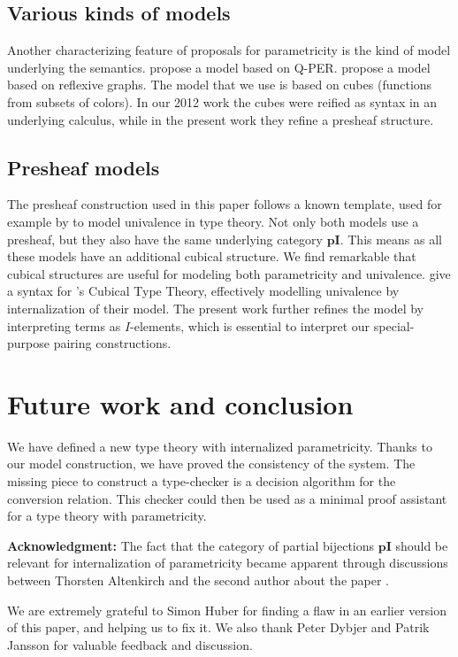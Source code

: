 \documentclass[english]{PaperTools/latex/lipics}
\def\pI{\ensuremath{\mathbf{pI}}}
\begin{document}
\subsection{Various kinds of models}
Another characterizing feature of proposals for parametricity is the
kind of model underlying the
semantics.  propose a model
based on Q-PER.  propose a model based
on reflexive graphs. The model that we use is based on cubes
(functions from subsets of colors). In
our 2012 work the cubes were reified as syntax in
an underlying calculus, while in the present work they refine a presheaf structure.

\subsection{Presheaf models}

The presheaf construction used in this paper follows a known template,
used for example by \citet{bezem2014model,DBLP:journals/corr/Pitts14}
to model univalence in type theory. Not only both models use a
presheaf, but they also have the same underlying category $\pI$.
This means as all these models have an additional cubical structure.
We find remarkable that cubical structures are useful for modeling both
parametricity and univalence.
\cite{altenkirch2014syntax} give a syntax for
\citeauthor{bezem2014model}'s Cubical Type Theory, effectively modelling
univalence by internalization of their model.
The present work further refines the model by interpreting terms as
$I$-elements, which is essential to interpret our special-purpose
pairing constructions.

\section{Future work and conclusion}
We have defined a new type theory with internalized parametricity.
Thanks to our model construction, we have proved the consistency of
the system. The missing piece to construct a type-checker is a
decision algorithm for the conversion relation.  This checker could
then be used as a minimal proof assistant for a type theory with
parametricity.

\bigskip
\noindent
\textbf{Acknowledgment:}
The fact that the category of partial bijections \pI{} should be
relevant for internalization of parametricity became apparent through
discussions between Thorsten Altenkirch and the second  author about
the paper \citep{bernardy_computational_2012}.

We are extremely grateful to Simon Huber for finding a flaw in an
earlier version of this paper, and helping us to fix it.
We also thank Peter Dybjer and Patrik Jansson for valuable feedback and
discussion.



\end{document}
